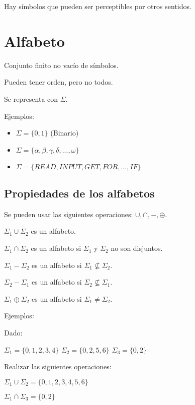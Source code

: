 \documentclass{article}
\begin{document}
Hay símbolos que pueden ser perceptibles por otros sentidos.

\section{Alfabeto}

Conjunto finito no vacío de símbolos.

Pueden tener orden, pero no todos.

Se representa con $\Sigma$.
\vspace{1em}

Ejemplos:

\begin{itemize}
	\item
	$\Sigma = \{0, 1\}$ (Binario)
	\item
	$\Sigma = \{\alpha, \beta, \gamma, \delta, ..., \omega\}$
	\item
	$\Sigma = \{READ, INPUT, GET, FOR, ..., IF\}$
\end{itemize}

\subsection{Propiedades de los alfabetos}

Se pueden usar las siguientes operaciones: $\cup, \cap, -, \oplus$.

$\Sigma_1 \cup \Sigma_2$ es un alfabeto.

$\Sigma_1 \cap \Sigma_2$ es un alfabeto si $\Sigma_1$ y $\Sigma_2$ no son
disjuntos.

$\Sigma_1 - \Sigma_2$ es un alfabeto si $\Sigma_1 \not\subseteq \Sigma_2$.

$\Sigma_2 - \Sigma_1$ es un alfabeto si $\Sigma_2 \not\subseteq \Sigma_1$.

$\Sigma_1 \oplus \Sigma_2$ es un alfabeto si $\Sigma_1 \ne \Sigma_2$.
\vspace{1em}

Ejemplos:
\vspace{1em}

Dado:

$\Sigma_1 = \{0, 1, 2, 3, 4\}$
$\Sigma_2 = \{0, 2, 5, 6\}$
$\Sigma_3 = \{0, 2\}$
\vspace{1em}

Realizar las siguientes operaciones:

$\Sigma_1 \cup \Sigma_2 = \{0, 1, 2, 3, 4, 5, 6\}$

$\Sigma_1 \cap \Sigma_3 = \{0, 2\}$
\end{document}
